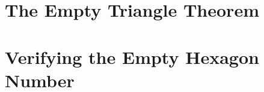 \documentclass{easychair}
\begin{document}
\section{The Empty Triangle Theorem}
\label{sec:empty-triangle}


\section{Verifying the Empty Hexagon Number}
\label{sec:empty-hexagon-number}



%
%
%


\end{document}
